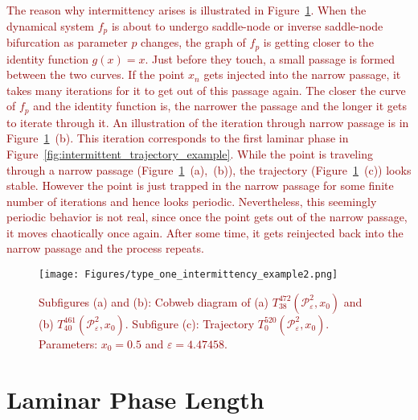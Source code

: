 \textcolor{darkred}{
The reason why intermittency arises is illustrated in Figure~\ref{fig:intermittent_cobweb_example}.
When the dynamical system $f_p$ is about to undergo saddle-node or inverse saddle-node bifurcation as parameter $p$ changes, the graph of $f_p$ is getting closer to the identity function $g(x)=x$.
Just before they touch, a small passage is formed between the two curves.
If the point $x_n$ gets injected into the narrow passage, it takes many iterations for it to get out of this passage again.
The closer the curve of $f_p$ and the identity function is, the narrower the passage and the longer it gets to iterate through it.
An illustration of the iteration through narrow passage is in Figure~\ref{fig:intermittent_cobweb_example}~(b).
This iteration corresponds to the first laminar phase in Figure~\ref{fig:intermittent_trajectory_example}.
While the point is traveling through a narrow passage (Figure~\ref{fig:intermittent_cobweb_example}~(a),~(b)), the trajectory (Figure~\ref{fig:intermittent_cobweb_example}~(c)) looks stable.
However the point is just trapped in the narrow passage for some finite number of iterations and hence looks periodic.
Nevertheless, this seemingly periodic behavior is not real, since once the point gets out of the narrow passage, it moves chaotically once again.
After some time, it gets reinjected back into the narrow passage and the process repeats.
}

\begin{figure}[!h]
    \centering
    \texttt{[image: Figures/type\_one\_intermittency\_example2.png]}
    \caption{
        \textcolor{darkred}{
        Subfigures (a) and (b):
        Cobweb diagram of 
        (a) $T^{472}_{38}(\mathcal{P}_{\varepsilon}^{2}, x_0)$ and
        (b) $T^{461}_{40}(\mathcal{P}_{\varepsilon}^{2}, x_0)$. 
        Subfigure (c):
        Trajectory $T^{520}_{0}(\mathcal{P}_{\varepsilon}^{2}, x_0)$.
        Parameters: $x_0 = 0.5$ and $\varepsilon = 4.47458$.
        }
    }
    \label{fig:intermittent_cobweb_example}
\end{figure}

\section{Laminar Phase Length}

